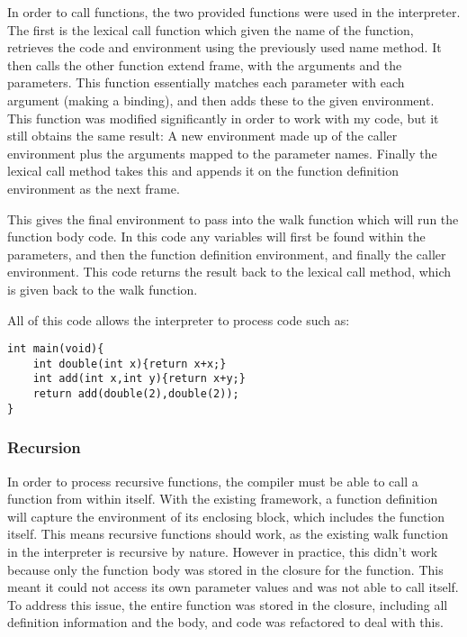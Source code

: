 \documentclass[11pt]{article}
\begin{document}
In order to call functions, the two provided functions were used in the interpreter. The first is the lexical call function which given the name of the function, retrieves the code and environment using the previously used name method. It then calls the other function extend frame, with the arguments and the parameters. This function essentially matches each parameter with each argument (making a binding), and then adds these to the given environment. This function was modified significantly in order to work with my code, but it still obtains the same result: A new environment made up of the caller environment plus the arguments mapped to the parameter names. Finally the lexical call method takes this and appends it on the function definition environment as the next frame. 

This gives the final environment to pass into the walk function which will run the function body code. In this code any variables will first be found within the parameters, and then the function definition environment, and finally the caller environment. This code returns the result back to the lexical call method, which is given back to the walk function. 

All of this code allows the interpreter to process code such as:

\begin{lstlisting}
int main(void){
	int double(int x){return x+x;}
	int add(int x,int y){return x+y;}
	return add(double(2),double(2));
}
\end{lstlisting}

\subsubsection{Recursion}

In order to process recursive functions, the compiler must be able to call a function from within itself. With the existing framework, a function definition will capture the environment of its enclosing block, which includes the function itself. This means recursive functions should work, as the existing walk function in the interpreter is recursive by nature. However in practice, this didn't work because only the function body was stored in the closure for the function. This meant it could not access its own parameter values and was not able to call itself. To address this issue, the entire function was stored in the closure, including all definition information and the body, and code was refactored to deal with this. 
\end{document}
